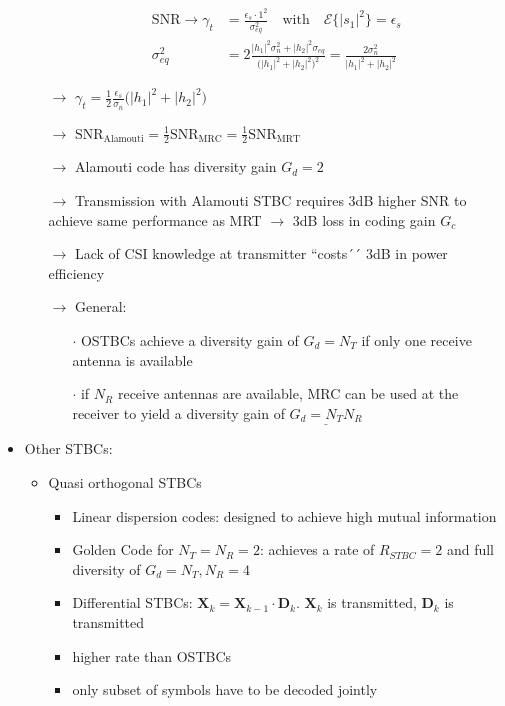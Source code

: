 \documentclass[a4paper, 10pt]{article}
\begin{document}
\begin{itemize}
\begin{itemize}
\begin{align*}
			\text{SNR} \rightarrow \gamma _t  &= \frac{\epsilon _s\cdot 1^2}{\sigma _{eq}^2}\quad \text{with}\quad \mathcal{E}\bigl\{ |s_1|^2\bigr\} = \epsilon _s\\ 	
			\sigma _{eq}^2 &= 2\frac{|h_1|^2\sigma _n^2 + |h_2|^2\sigma _{eq}}{\bigl(|h_1|^2 + |h_2|^2\bigr)^2} = \frac{2\sigma _n^2}{|h_1|^2 + |h_2|^2}
		\end{align*}
		\item[$\rightarrow$] $\gamma _t = \frac{1}{2}\frac{\epsilon _s}{\sigma _n}\bigl ( |h_1|^2 + |h_2|^2\bigr)$
		\item[$\rightarrow$] $\text{SNR}_{\text{Alamouti}} = \frac{1}{2}\text{SNR}_{\text{MRC}} = \frac{1}{2}\text{SNR}_{\text{MRT}}$
		\item[$\rightarrow$] Alamouti code has diversity gain $G_d = 2$
		\item[$\rightarrow$] Transmission with Alamouti STBC requires 3dB higher SNR to achieve same performance as MRT $\rightarrow$  3dB loss in coding gain $G_c$
		\item[$\rightarrow$] Lack of CSI knowledge at transmitter ``costs´´ 3dB in power efficiency
		\item[$\rightarrow$] General: 
		\begin{itemize}
			\item[$\cdot$] OSTBCs achieve a diversity gain of $G_d = N_T$ if only one receive antenna is available
			\item[$\cdot$] if $ N_R $ receive antennas are available, MRC can be used at the receiver to yield a diversity gain of $\underline{G_d = N_TN_R}$
		\end{itemize}
	\end{itemize}
\item Other STBCs:
	\begin{itemize}
		\item Quasi orthogonal STBCs
		\begin{itemize}
		\item Linear dispersion codes: designed to achieve high mutual information
		\item Golden Code for $ N_T = N_R = 2$: achieves a rate of $R_{STBC} = 2 $ and full diversity of $ G_d = N_T, N_R = 4$
		\item Differential STBCs: $\textbf{X}_k = \textbf{X}_{k-1}\cdot \textbf{D}_k $. $\textbf{X}_k $ is transmitted, $\textbf{D}_k $ is transmitted  
			\item higher rate than OSTBCs
			\item only subset of symbols have to be decoded jointly

\end{itemize}
\end{itemize}
\end{itemize}
\end{document}
